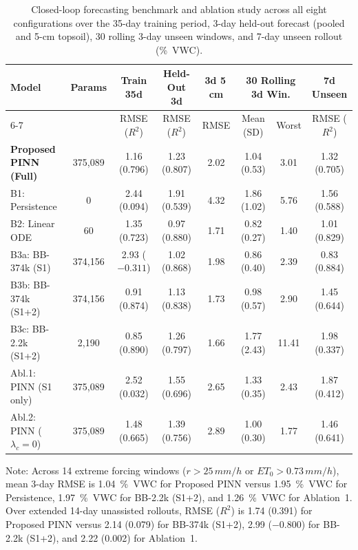 \documentclass[pdflatex,sn-nature]{sn-jnl}%
\theoremstyle{thmstyleone}%
\theoremstyle{thmstyletwo}%
\theoremstyle{thmstylethree}%
\begin{document}
\begin{table}[!htbp]
\centering
\caption{Closed-loop forecasting benchmark and ablation study across all eight configurations over the 35-day training period, 3-day held-out forecast (pooled and 5-\si{cm} topsoil), 30 rolling 3-day unseen windows, and 7-day unseen rollout (\si{\%VWC}).}
\label{tab:benchmarks_master}
\fontsize{6.2}{7.8}\selectfont
\setlength{\tabcolsep}{1.6pt}
\begin{tabular*}{\textwidth}{@{\extracolsep{\fill}}lccccccc@{}}
\toprule
Model & Params & Train 35d & Held-Out 3d & 3d 5\,\si{cm} & \multicolumn{2}{c}{30 Rolling 3d Win.} & 7d Unseen \\
\cmidrule(lr){6-7}
 & & RMSE ($R^2$) & RMSE ($R^2$) & RMSE & Mean (SD) & Worst & RMSE ($R^2$) \\
\midrule
\textbf{Proposed PINN (Full)} & 375,089 & 1.16 (0.796) & 1.23 (0.807) & 2.02 & 1.04 (0.53) & 3.01 & 1.32 (0.705) \\
B1: Persistence & 0 & 2.44 (0.094) & 1.91 (0.539) & 4.32 & 1.86 (1.02) & 5.76 & 1.56 (0.588) \\
B2: Linear ODE & 60 & 1.35 (0.723) & 0.97 (0.880) & 1.71 & 0.82 (0.27) & 1.40 & 1.01 (0.829) \\
B3a: BB-374k (S1) & 374,156 & 2.93 ($-0.311$) & 1.02 (0.868) & 1.98 & 0.86 (0.40) & 2.39 & 0.83 (0.884) \\
B3b: BB-374k (S1+2) & 374,156 & 0.91 (0.874) & 1.13 (0.838) & 1.73 & 0.98 (0.57) & 2.90 & 1.45 (0.644) \\
B3c: BB-2.2k (S1+2) & 2,190 & 0.85 (0.890) & 1.26 (0.797) & 1.66 & 1.77 (2.43) & 11.41 & 1.98 (0.337) \\
Abl.1: PINN (S1 only) & 375,089 & 2.52 (0.032) & 1.55 (0.696) & 2.65 & 1.33 (0.35) & 2.43 & 1.87 (0.412) \\
Abl.2: PINN ($\lambda_c{=}0$) & 375,089 & 1.48 (0.665) & 1.39 (0.756) & 2.89 & 1.00 (0.30) & 1.77 & 1.46 (0.641) \\
\bottomrule
\end{tabular*}
\begin{tablenotes}
\footnotesize
\item Note: Across 14 extreme forcing windows ($r > 25\,\si{mm/h}$ or $ET_0 > 0.73\,\si{mm/h}$), mean 3-day RMSE is \SI{1.04}{\%VWC} for Proposed PINN versus \SI{1.95}{\%VWC} for Persistence, \SI{1.97}{\%VWC} for BB-2.2k (S1+2), and \SI{1.26}{\%VWC} for Ablation~1. Over extended 14-day unassisted rollouts, RMSE ($R^2$) is 1.74 (0.391) for Proposed PINN versus 2.14 (0.079) for BB-374k (S1+2), 2.99 ($-0.800$) for BB-2.2k (S1+2), and 2.22 (0.002) for Ablation~1.
\end{tablenotes}
\end{table}
\end{document}
